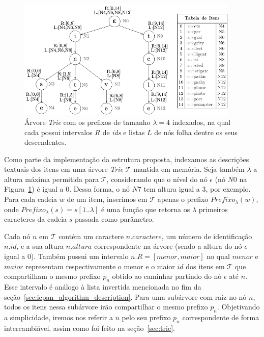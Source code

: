  
 \begin{figure} [ht]
    \centering
    \includegraphics[width=0.94\textwidth]{figures/index-structure.png}
    \caption{Árvore \textit{Trie} com os prefixos de tamanho $\lambda = 4$ indexados, na qual cada possui intervalos $R$ de \textit{ids} e listas $L$ de nós folha dentre os seus descendentes.}
    \label{fig:index_structure}
\end{figure}

 
Como parte da implementação da estrutura proposta, indexamos as descrições textuais dos itens em uma árvore \textit{Trie} $\mathcal{T}$ mantida em memória. Seja também $\lambda$ a altura máxima permitida para $\mathcal{T}$, considerando que o nível do nó $\epsilon$ (nó $N0$ na Figura~\ref{fig:index_structure}) é igual a $0$. Dessa forma, o nó $N7$ tem altura igual a $3$, por exemplo. Para cada cadeia $w$ de um item, inserimos em $\mathcal{T}$ apenas o prefixo $Prefixo_{\lambda}(w)$, onde $Prefixo_{\lambda}(s) = s[1..\lambda]$ é uma função que retorna os $\lambda$ primeiros caracteres da cadeia $s$ passada como parâmetro.

Cada nó $n$ em $\mathcal{T}$ contém um caractere $n.caractere$, um número de identificação $n.id$, e a sua altura $n.altura$ correspondente na árvore (sendo a altura do nó $\epsilon$ igual a 0). Também possui um intervalo $n.R = [menor, maior]$ no qual $menor$ e $maior$ representam respectivamente o menor e o maior $id$ dos itens em $\mathcal{T}$ que compartilham o mesmo prefixo $p_{n}$ obtido ao caminhar partindo do nó $\epsilon$ até $n$. Esse intervalo é análogo à lista invertida mencionada no fim da seção~\ref{sec:icpan_algorithm_description}. Para uma subárvore com raiz no nó $n$, todos os itens nessa subárvore irão compartilhar o mesmo prefixo $p_{n}$. Objetivando a simplicidade, iremos nos referir a $n$ pelo seu prefixo $p_{n}$ correspondente de forma intercambiável, assim como foi feito na seção~\ref{sec:trie}. 

